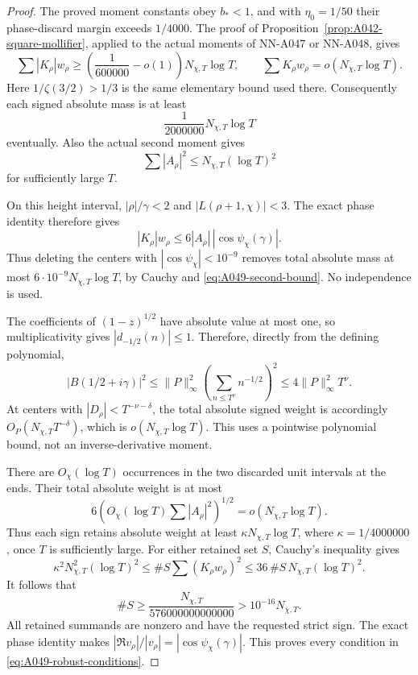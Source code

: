 \begin{proof}
The proved moment constants obey \(b_*<1\), and with
\(\eta_0=1/50\) their phase-discard margin exceeds \(1/4000\).
The proof of Proposition~\ref{prop:A042-square-mollifier},
applied to the actual moments of NN-A047 or NN-A048, gives
\[
 \sum |K_\rho|w_\rho
     \ge\left(\frac1{600000}-o(1)\right)N_{\chi,T}\log T,
 \qquad
 \sum K_\rho w_\rho=o(N_{\chi,T}\log T).
\]
Here \(1/\zeta(3/2)>1/3\) is the same elementary bound used
there. Consequently each signed absolute mass is at least
\[
                    \frac1{2000000}N_{\chi,T}\log T
\]
eventually. Also the actual second moment gives
\begin{equation}\label{eq:A049-second-bound}
 \sum |A_\rho|^2\le N_{\chi,T}(\log T)^2
\end{equation}
for sufficiently large \(T\).

On this height interval, \(|\rho|/\gamma<2\) and
\(|L(\rho+1,\chi)|<3\). The exact phase identity therefore
gives
\[
 |K_\rho|w_\rho\le6|A_\rho|\,|\cos\psi_\chi(\gamma)|.
\]
Thus deleting the centers with
\(|\cos\psi_\chi|<10^{-9}\) removes total absolute mass at
most \(6\cdot10^{-9}N_{\chi,T}\log T\), by Cauchy and
\eqref{eq:A049-second-bound}. No independence is used.

The coefficients of \((1-z)^{1/2}\) have absolute value
at most one, so multiplicativity gives
\(|d_{-1/2}(n)|\le1\). Therefore, directly from the
defining polynomial,
\[
 |B(1/2+i\gamma)|^2
 \le \|P\|_\infty^2
        \left(\sum_{n\le T^\nu}n^{-1/2}\right)^2
 \le4\|P\|_\infty^2T^\nu .
\]
At centers with \(|D_\rho|<T^{-\nu-\delta}\), the total
absolute signed weight is accordingly
\(O_P(N_{\chi,T}T^{-\delta})\), which is
\(o(N_{\chi,T}\log T)\). This uses a pointwise polynomial
bound, not an inverse-derivative moment.

There are \(O_\chi(\log T)\) occurrences in the two discarded
unit intervals at the ends. Their total absolute weight is
at most
\[
 6\left(O_\chi(\log T)\sum|A_\rho|^2\right)^{1/2}
                         =o(N_{\chi,T}\log T).
\]
Thus each sign retains absolute weight at least
\(\kappa N_{\chi,T}\log T\), where
\(\kappa=1/4000000\), once \(T\) is sufficiently large.
For either retained set \(S\), Cauchy's inequality gives
\[
 \kappa^2 N_{\chi,T}^2(\log T)^2
 \le \#S\sum (K_\rho w_\rho)^2
 \le36\,\#S\,N_{\chi,T}(\log T)^2.
\]
It follows that
\[
 \#S\ge\frac{N_{\chi,T}}{576000000000000}
                           >10^{-16}N_{\chi,T}.
\]
All retained summands are nonzero and have the requested
strict sign. The exact phase identity makes
\(|\Re v_\rho|/|v_\rho|=|\cos\psi_\chi(\gamma)|\).
This proves every condition in \eqref{eq:A049-robust-conditions}.
\end{proof}

